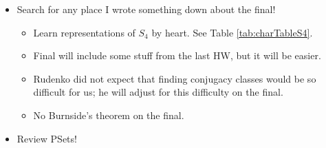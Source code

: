 \documentclass[../notes.tex]{subfiles}
\begin{document}
\begin{itemize}
    \item Search for any place I wrote something down about the final!
    \begin{itemize}
        \item Learn representations of $S_4$ by heart. See Table \ref{tab:charTableS4}.
        \item Final will include some stuff from the last HW, but it will be easier.
        \item Rudenko did not expect that finding conjugacy classes would be so difficult for us; he will adjust for this difficulty on the final.
        \item No Burnside's theorem on the final.
    \end{itemize}
    \item Review PSets!
\end{itemize}
\end{document}
